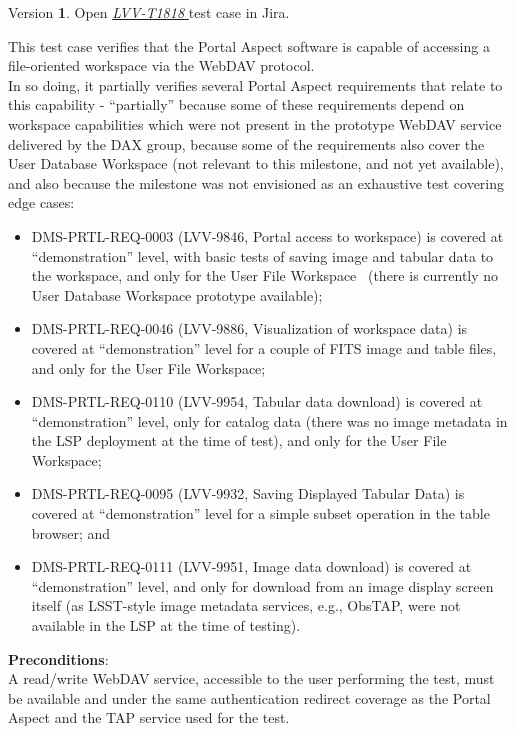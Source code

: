 \documentclass[DM,lsstdraft,STR,toc]{lsstdoc}
\providecommand{\tightlist}{
  \setlength{\itemsep}{0pt}\setlength{\parskip}{0pt}}
\begin{document}
Version \textbf{1}.
Open  \href{https://jira.lsstcorp.org/secure/Tests.jspa#/testCase/LVV-T1818}{\textit{ LVV-T1818 } }
test case in Jira.

This test case verifies that the Portal Aspect software is capable of
accessing a file-oriented workspace via the WebDAV
protocol.\\[2\baselineskip]In so doing, it partially verifies several
Portal Aspect requirements that relate to this capability -
``partially'' because some of these requirements depend on workspace
capabilities which were not present in the prototype WebDAV service
delivered by the DAX group, because some of the requirements also cover
the User Database Workspace (not relevant to this milestone, and not yet
available), and also because the milestone was not envisioned as an
exhaustive test covering edge cases:

\begin{itemize}
\tightlist
\item
  DMS-PRTL-REQ-0003 (LVV-9846, Portal access to workspace) is covered at
  ``demonstration'' level, with basic tests of saving image and tabular
  data to the workspace, and only for the User File Workspace ~(there is
  currently no User Database Workspace prototype available);
\item
  DMS-PRTL-REQ-0046 (LVV-9886, Visualization of workspace data) is
  covered at ``demonstration'' level for a couple of FITS image and
  table files, and only for the User File Workspace;
\item
  DMS-PRTL-REQ-0110 (LVV-9954, Tabular data download) is covered at
  ``demonstration'' level, only for catalog data (there was no image
  metadata in the LSP deployment at the time of test), and only for the
  User File Workspace;~
\item
  DMS-PRTL-REQ-0095 (LVV-9932, Saving Displayed Tabular Data) is covered
  at ``demonstration'' level for a simple subset operation in the table
  browser; and
\item
  DMS-PRTL-REQ-0111 (LVV-9951, Image data download) is covered at
  ``demonstration'' level, and only for download from an image display
  screen itself (as LSST-style image metadata services, e.g., ObsTAP,
  were not available in the LSP at the time of testing).
\end{itemize}

\textbf{ Preconditions}:\\
A read/write WebDAV service, accessible to the user performing the test,
must be available and under the same authentication redirect coverage as
the Portal Aspect and the TAP service used for the test.
\end{document}
